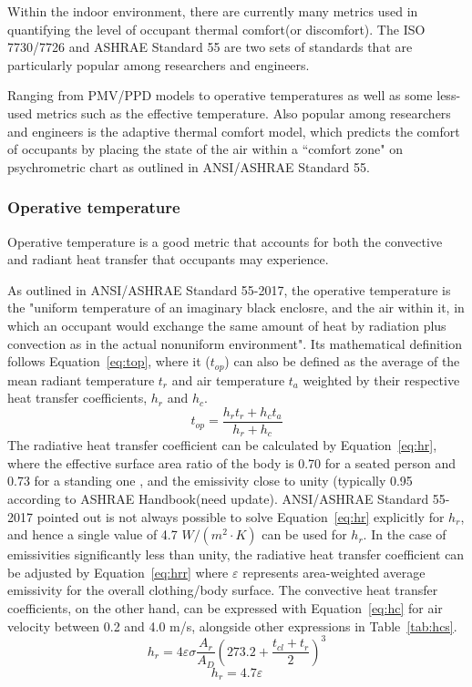 Within the indoor environment, there are currently many metrics used in quantifying the level of occupant thermal comfort(or discomfort). The ISO 7730/7726 and ASHRAE Standard 55 are two sets of standards that are particularly popular among researchers and engineers.
    
Ranging from PMV/PPD models to operative temperatures as well as some less-used metrics such as the effective temperature. Also popular among researchers and engineers is the adaptive thermal comfort model, which predicts the comfort of occupants by placing the state of the air within a ``comfort zone" on psychrometric chart as outlined in ANSI/ASHRAE Standard 55\cite{ashrae_ansi/ashrae_2013}.
\subsubsection{Operative temperature}
    Operative temperature is a good metric that accounts for both the convective and radiant heat transfer that occupants may experience.%
        
    As outlined in ANSI/ASHRAE Standard 55-2017, the operative temperature is the "uniform temperature of an imaginary black enclosre, and the air within it, in which an occupant would exchange the same amount of heat by radiation plus convection as in the actual nonuniform environment". Its mathematical definition follows Equation~\ref{eq:top}, where it ($t_{op}$) can also be defined as the average of the mean radiant temperature $t_r$ and air temperature $t_a$ weighted by their respective heat transfer coefficients, $h_r$ and $h_c$. 
        \begin{equation}
            t_{op} = \frac{h_r t_r + h_c t_a}{h_r + h_c}\label{eq:top}
        \end{equation}
    The radiative heat transfer coefficient can be calculated by Equation~\ref{eq:hr}, where the effective surface area ratio of the body is 0.70 for a seated person and 0.73 for a standing one \cite{fanger_calculation_1967}, and the emissivity close to unity (typically 0.95 according to ASHRAE Handbook\cite{ashrae_thermal_2003}(need update). ANSI/ASHRAE Standard 55-2017 pointed out is not always possible to solve Equation~\ref{eq:hr} explicitly for $h_r$, and hence a single value of 4.7 $W/(m^2\cdot K)$ can be used for $h_r$\cite{ansi/ashrae_standard_2017}. In the case of emissivities significantly less than unity, the radiative heat transfer coefficient can be adjusted by Equation~\ref{eq:hrr} where $\varepsilon$ represents area-weighted average emissivity for the overall clothing/body surface. The convective heat transfer coefficients, on the other hand, can be expressed with Equation~\ref{eq:hc} for air velocity between 0.2 and 4.0 m/s, alongside other expressions in Table~\ref{tab:hcs}.
        \begin{equation}
            h_r = 4\varepsilon \sigma \frac{A_r}{A_D} (273.2+ \frac{t_{cl}+t_r}{2})^3\label{eq:hr}
        \end{equation}
        \begin{equation}
            h_r = 4.7\varepsilon\label{eq:hrr}
        \end{equation}
        
